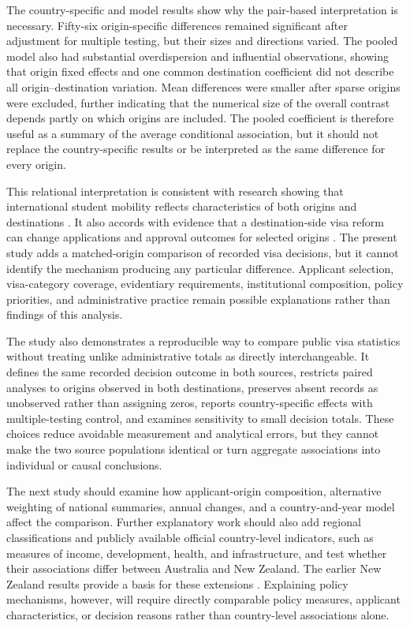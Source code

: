 \documentclass[runningheads]{llncs}
\begin{document}
The country-specific and model results show why the pair-based interpretation is necessary. Fifty-six origin-specific differences remained significant after adjustment for multiple testing, but their sizes and directions varied. The pooled model also had substantial overdispersion and influential observations, showing that origin fixed effects and one common destination coefficient did not describe all origin--destination variation. Mean differences were smaller after sparse origins were excluded, further indicating that the numerical size of the overall contrast depends partly on which origins are included. The pooled coefficient is therefore useful as a summary of the average conditional association, but it should not replace the country-specific results or be interpreted as the same difference for every origin.

This relational interpretation is consistent with research showing that international student mobility reflects characteristics of both origins and destinations \cite{PerkinsNeumayer2014,Weber2023}. It also accords with evidence that a destination-side visa reform can change applications and approval outcomes for selected origins \cite{Gonnot2025}. The present study adds a matched-origin comparison of recorded visa decisions, but it cannot identify the mechanism producing any particular difference. Applicant selection, visa-category coverage, evidentiary requirements, institutional composition, policy priorities, and administrative practice remain possible explanations rather than findings of this analysis.

The study also demonstrates a reproducible way to compare public visa statistics without treating unlike administrative totals as directly interchangeable. It defines the same recorded decision outcome in both sources, restricts paired analyses to origins observed in both destinations, preserves absent records as unobserved rather than assigning zeros, reports country-specific effects with multiple-testing control, and examines sensitivity to small decision totals. These choices reduce avoidable measurement and analytical errors, but they cannot make the two source populations identical or turn aggregate associations into individual or causal conclusions.

The next study should examine how applicant-origin composition, alternative weighting of national summaries, annual changes, and a country-and-year model affect the comparison. Further explanatory work should also add regional classifications and publicly available official country-level indicators, such as measures of income, development, health, and infrastructure, and test whether their associations differ between Australia and New Zealand. The earlier New Zealand results provide a basis for these extensions \cite{Kaplan2026NZVisaApproval}. Explaining policy mechanisms, however, will require directly comparable policy measures, applicant characteristics, or decision reasons rather than country-level associations alone.
\end{document}
